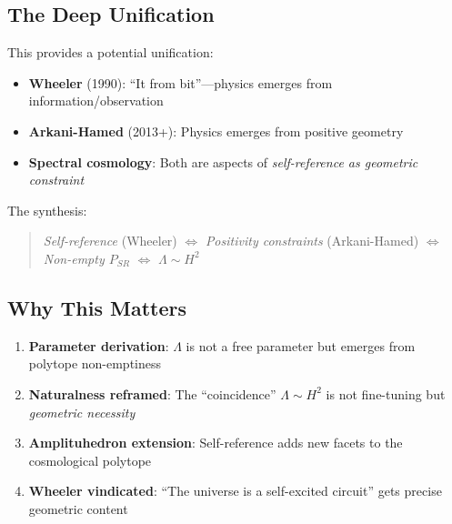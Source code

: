 \subsection{The Deep Unification}

\begin{center}
\end{center}

This provides a potential unification:

\begin{itemize}
    \item \textbf{Wheeler} (1990): ``It from bit''---physics emerges from information/observation
    \item \textbf{Arkani-Hamed} (2013+): Physics emerges from positive geometry
    \item \textbf{Spectral cosmology}: Both are aspects of \emph{self-reference as geometric constraint}
\end{itemize}

The synthesis:
\begin{quote}
\emph{Self-reference} (Wheeler) $\Leftrightarrow$ \emph{Positivity constraints} (Arkani-Hamed) $\Leftrightarrow$ \emph{Non-empty $P_{SR}$} $\Leftrightarrow$ $\Lambda \sim H^2$
\end{quote}

\subsection{Why This Matters}

\begin{enumerate}
    \item \textbf{Parameter derivation}: $\Lambda$ is not a free parameter but emerges from polytope non-emptiness

    \item \textbf{Naturalness reframed}: The ``coincidence'' $\Lambda \sim H^2$ is not fine-tuning but \emph{geometric necessity}

    \item \textbf{Amplituhedron extension}: Self-reference adds new facets to the cosmological polytope

    \item \textbf{Wheeler vindicated}: ``The universe is a self-excited circuit'' gets precise geometric content
\end{enumerate}

